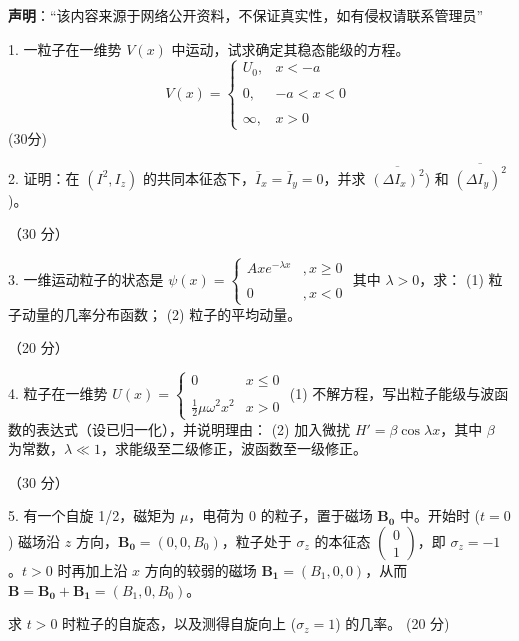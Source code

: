 
\textbf{声明}：“该内容来源于网络公开资料，不保证真实性，如有侵权请联系管理员”

1. 一粒子在一维势 \( V(x) \) 中运动，试求确定其稳态能级的方程。
$$V(x) = \begin{cases} U_0, & x < -a \\\\0, & -a < x < 0 \\\\\infty, & x > 0 \end{cases}~$$
(30分)

2. 证明：在 $\left( I^2, I_z \right)$ 的共同本征态下，$\overline{I}_x = \overline{I}_y = 0$，并求 $\overline{\left( \Delta I_x \right)^2}$) 和 $\overline{\left( \Delta I_y \right)^2}$)。

（30 分）

3. 一维运动粒子的状态是 $\psi(x) = \begin{cases} Axe^{-\lambda x} &, x \geq 0 \\\\0 & ,x < 0\end{cases}$
其中 $\lambda > 0$，求：
(1) 粒子动量的几率分布函数；
(2) 粒子的平均动量。

（20 分）

4. 粒子在一维势 $U(x) = \begin{cases} 0 & x \leq 0 \\\\ \frac{1}{2}\mu \omega^2 x^2 & x > 0 \end{cases}$
(1) 不解方程，写出粒子能级与波函数的表达式（设已归一化），并说明理由：
(2) 加入微扰 $H' = \beta \cos \lambda x$，其中 $\beta$ 为常数，$\lambda \ll 1$，求能级至二级修正，波函数至一级修正。

（30 分）

 5. 有一个自旋 1/2，磁矩为 $\mu$，电荷为 0 的粒子，置于磁场 $\mathbf{B_0}$ 中。开始时 ($t=0$) 磁场沿 $z$ 方向，$\mathbf{B_0} = (0, 0, B_0)$，粒子处于 $ \sigma_z$ 的本征态 $\begin{pmatrix} 0 \\ 1 \end{pmatrix}$，即 $ \sigma_z = -1$。$t>0$ 时再加上沿 $x$ 方向的较弱的磁场 $\mathbf{B_1} = (B_1, 0, 0)$，从而 $\mathbf{B} = \mathbf{B_0} + \mathbf{B_1} = (B_1, 0, B_0)$。

求 $t > 0$ 时粒子的自旋态，以及测得自旋向上 ($ \sigma_z = 1$) 的几率。 (20 分)

